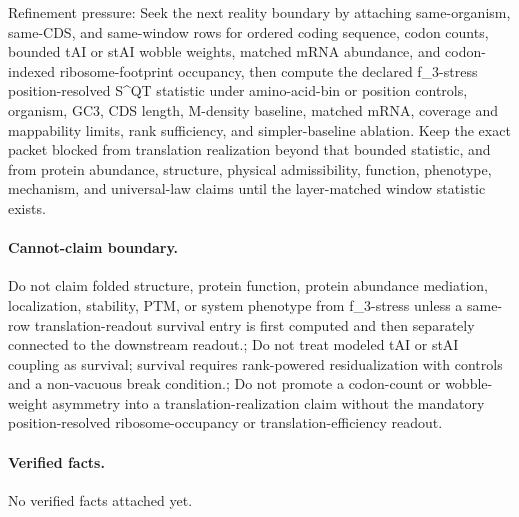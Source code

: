 Refinement pressure: Seek the next reality boundary by attaching same-organism, same-CDS, and same-window rows for ordered coding sequence, codon counts, bounded tAI or stAI wobble weights, matched mRNA abundance, and codon-indexed ribosome-footprint occupancy, then compute the declared f\_3-stress position-resolved S\textasciicircum{}QT statistic under amino-acid-bin or position controls, organism, GC3, CDS length, M-density baseline, matched mRNA, coverage and mappability limits, rank sufficiency, and simpler-baseline ablation. Keep the exact packet blocked from translation realization beyond that bounded statistic, and from protein abundance, structure, physical admissibility, function, phenotype, mechanism, and universal-law claims until the layer-matched window statistic exists.

\paragraph{Cannot-claim boundary.} Do not claim folded structure, protein function, protein abundance mediation, localization, stability, PTM, or system phenotype from f\_3-stress unless a same-row translation-readout survival entry is first computed and then separately connected to the downstream readout.; Do not treat modeled tAI or stAI coupling as survival; survival requires rank-powered residualization with controls and a non-vacuous break condition.; Do not promote a codon-count or wobble-weight asymmetry into a translation-realization claim without the mandatory position-resolved ribosome-occupancy or translation-efficiency readout.

\paragraph{Verified facts.}
No verified facts attached yet.
